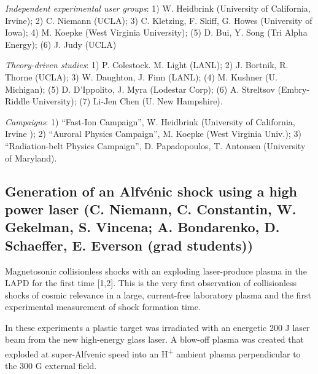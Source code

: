 \documentclass[11pt]{article}
\begin{document}
\begin{description}
\item{\emph{Independent experimental user groups}}: 1) W. Heidbrink
(University of California, Irvine); 2) C. Niemann (UCLA); 3) C. Kletzing, F. Skiff, G. Howes (University of Iowa); 4) M.
Koepke (West Virginia University); (5) D. Bui, Y. Song (Tri Alpha
Energy); (6) J. Judy (UCLA)

\item{\emph{Theory-driven studies}}: 1) P. Colestock. M. Light (LANL);
2) J. Bortnik, R. Thorne (UCLA); 3) W. Daughton, J. Finn (LANL); (4) M.
Kushner (U. Michigan); (5) D. D'Ippolito, J. Myra (Lodestar Corp); (6)
A. Streltsov (Embry-Riddle University); (7) Li-Jen Chen (U. New
Hampshire).

\item{\emph{Campaigns}}: 1) ``Fast-Ion Campaign'', W. Heidbrink
(University of California, Irvine ); 2) ``Auroral Physics Campaign'', M. Koepke (West Virginia Univ.); 3)
``Radiation-belt Physics Campaign'', D. Papadopoulos, T. Antonsen (University of Maryland).




\subsection{Generation of an Alfv\'{e}nic shock
using a high power laser  (C. Niemann, C. Constantin, W. Gekelman,
S. Vincena; A. Bondarenko, D. Schaeffer, E. Everson (grad students))}

Magnetosonic collisionless shocks with an exploding laser-produce plasma
in the LAPD for the first time {[}1,2{]}. This is the very first
observation of collisionless shocks of cosmic relevance in a large,
current-free laboratory plasma and the first experimental measurement of
shock formation time.

In these experiments a plastic target was irradiated with an energetic
200 J laser beam from the new high-energy glass laser. A blow-off plasma
was created that exploded at super-Alfvenic speed into an
H\textsuperscript{+} ambient plasma perpendicular to the 300 G external
field.


\end{description}
\end{document}
